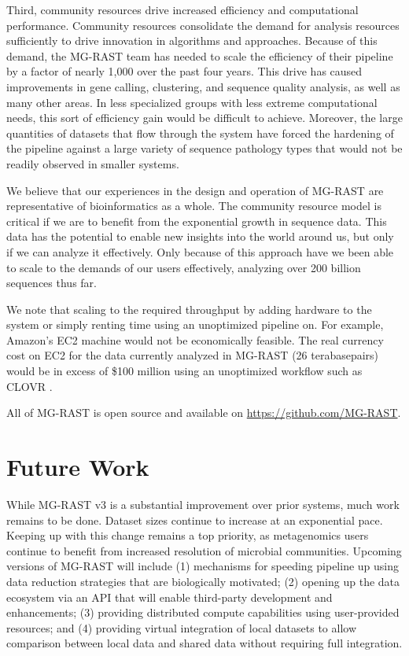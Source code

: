 \documentclass[12pt,fullpage]{report}
\begin{document}
Third, community resources drive increased efficiency and computational performance. Community resources consolidate the demand for analysis resources sufficiently to drive innovation in algorithms and approaches. Because of this demand, the MG-RAST team has needed to scale the efficiency of their pipeline by a factor of nearly 1,000 over the past four years. This drive has caused improvements in gene calling, clustering, and sequence quality analysis, as well as many other areas. In less specialized groups with less extreme computational needs, this sort of efficiency gain would be difficult to achieve. Moreover, the large quantities of datasets that flow through the system have forced the hardening of the pipeline against a large variety of sequence pathology types that would not be readily observed in smaller systems.

We believe that our experiences in the design and operation of MG-RAST are representative of bioinformatics as a whole. The community resource model is critical if we are to benefit from the exponential growth in sequence data. This data has the potential to enable new insights into the world around us, but only if we can analyze it effectively. Only because of this approach have we been able to scale to the demands of our users effectively, analyzing over 200 billion sequences thus far.

We note that scaling to the required throughput by adding hardware to the system or simply renting time using an unoptimized pipeline on. For example,  Amazon's EC2 machine would not be economically feasible. The real currency cost on EC2 for the data currently analyzed in MG-RAST (26 terabasepairs) would be in excess of \$100 million using an unoptimized workflow such as CLOVR \cite{CLOVR}.

All of MG-RAST is open source and available on \url{https://github.com/MG-RAST}.
\section{Future Work}

While MG-RAST v3 is a substantial improvement over prior systems, much work remains to be done. Dataset sizes continue to increase at an exponential pace. Keeping up with this change remains a top priority, as metagenomics users continue to benefit from increased resolution of microbial communities. Upcoming versions of MG-RAST will include (1) mechanisms for speeding pipeline up using data reduction strategies that are biologically motivated; (2) opening up the data ecosystem via an API that will enable third-party development and enhancements; (3) providing distributed compute capabilities using user-provided resources; and (4) providing virtual integration of local datasets to allow comparison between local data and shared data without requiring full integration.
\end{document}
